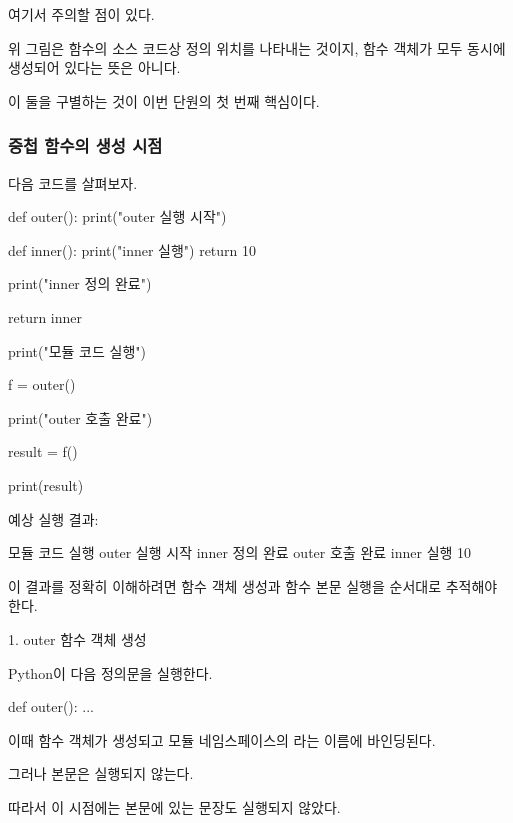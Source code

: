 여기서 주의할 점이 있다.

위 그림은 함수의 소스 코드상 정의 위치를 나타내는 것이지, 함수 객체가 모두 동시에 생성되어 있다는 뜻은 아니다.

이 둘을 구별하는 것이 이번 단원의 첫 번째 핵심이다.

\subsubsection{중첩 함수의 생성 시점}

다음 코드를 살펴보자.

\begin{dhkcode}
def outer():
    print("outer 실행 시작")

    def inner():
        print("inner 실행")
        return 10

    print("inner 정의 완료")

    return inner

print("모듈 코드 실행")

f = outer()

print("outer 호출 완료")

result = f()

print(result)
\end{dhkcode}

예상 실행 결과:

\begin{dhkzsh}
모듈 코드 실행
outer 실행 시작
inner 정의 완료
outer 호출 완료
inner 실행
10
\end{dhkzsh}

이 결과를 정확히 이해하려면 함수 객체 생성과 함수 본문 실행을 순서대로 추적해야 한다.

\begin{dhknote}
\begin{dhksmry}[centered]
1. outer 함수 객체 생성
\end{dhksmry}
\end{dhknote}

Python이 다음 정의문을 실행한다.

\begin{dhkcode}
def outer():
    ...
\end{dhkcode}

이때  함수 객체가 생성되고 모듈 네임스페이스의 라는 이름에 바인딩된다.

그러나  본문은 실행되지 않는다.

따라서 이 시점에는  본문에 있는  문장도 실행되지 않았다.

